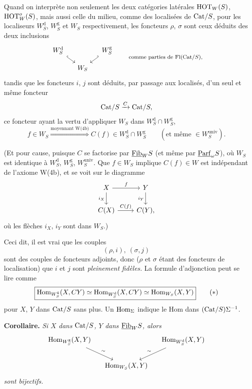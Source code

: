 \noindent{}
Quand on interprète non seulement les deux catégories latérales $\mathrm{HOT}_W(S)$, $\mathrm{HOT}^{o}_W(S)$, mais aussi celle du milieu, comme des localisées de $\mathrm{Cat}/S$, pour les localiseurs $W^{\mathrm{d}}_S$, $W^{\mathrm{g}}_S$ et $W_S$ respectivement, les foncteurs $\rho$, $\sigma$ sont ceux déduits des deux inclusions
\[
\begin{tikzcd}[column sep=small, row sep=small]
W^{\mathrm{d}}_S \arrow[dr, hook] & & W^{\mathrm{g}}_S \arrow[dl, hook'] \\
 & W_S &
\end{tikzcd}
\qquad \text{\footnotesize comme parties de Fl(Cat/$S$),}
\]
tandis que les foncteurs $i$, $j$ sont déduits, par passage aux localisés, d’un seul et même foncteur
\[
\mathrm{Cat}/S \xrightarrow{C} \mathrm{Cat}/S,
\]
ce foncteur ayant la vertu d’appliquer $W_S$ dans $W^{\mathrm{d}}_S \cap W^{\mathrm{g}}_S$,
\[
f \in W_S \overset{\text{moyennant W(4b)}}{\Longrightarrow} C(f) \in W^{\mathrm{d}}_S \cap W^{\mathrm{g}}_S \qquad (\text{et même } \in W^{\mathrm{univ}}_S).
\]

(Et pour cause, puisque $C$ se factorise par $\underline{\mathrm{Fib}}_W S$ (et même par $\underline{\mathrm{Parf}}_\omega S$), où $W_S$ est identique à $W^{\mathrm{d}}_S$, $W^{\mathrm{g}}_S$, $W^{\mathrm{univ}}_S$. Que $f \in W_S$ implique $C(f) \in W$ est indépendant de l’axiome W(4b), et se voit sur le diagramme
\[
\begin{tikzcd}
X \arrow[r, "f"] \arrow[d, "i_X"'] & Y \arrow[d, "i_Y"'] \\
C(X) \arrow[r, "C(f)"] & C(Y),
\end{tikzcd}
\]
où les flèches $i_X$, $i_Y$ sont dans $W_S$.)

Ceci dit, il est vrai que les couples
\[
(\rho, i),\ (\sigma, j)
\]
sont des couples de foncteurs adjoints, donc ($\rho$ et $\sigma$ étant des foncteurs de localisation) que $i$ et $j$ sont \textit{pleinement fidèles.} La formule d’adjonction peut se lire comme
\[
\boxed{\Hom_{W^{\mathrm{g}}_S}(X, CY) \simeq \Hom_{W^{\mathrm{d}}_S}(X, CY) \simeq \Hom_{W_S}(X, Y)}
\tag*{$(\ast)$}
\]
pour $X$, $Y$ dans $\mathrm{Cat}/S$ sans plus. Un $\mathrm{Hom}_\Sigma$ indique le Hom dans $(\mathrm{Cat}/S)\Sigma^{-1}$.

\noindent\textbf{Corollaire.} \textit{Si $X$ dans} $\mathrm{Cat}/S$\textit{, $Y$ dans} $\underline{\mathrm{Fib}}_W S$\textit{, alors}
\[
\begin{tikzcd}[column sep=small]
\Hom_{W^{\mathrm{g}}_S}(X, Y) \arrow[dr, "\sim"] & & \Hom_{W^{\mathrm{d}}_S}(X, Y) \arrow[dl, "\sim"'] \\
 & \Hom_{W_S}(X, Y) &
\end{tikzcd}
\]
\textit{sont bijectifs.}

